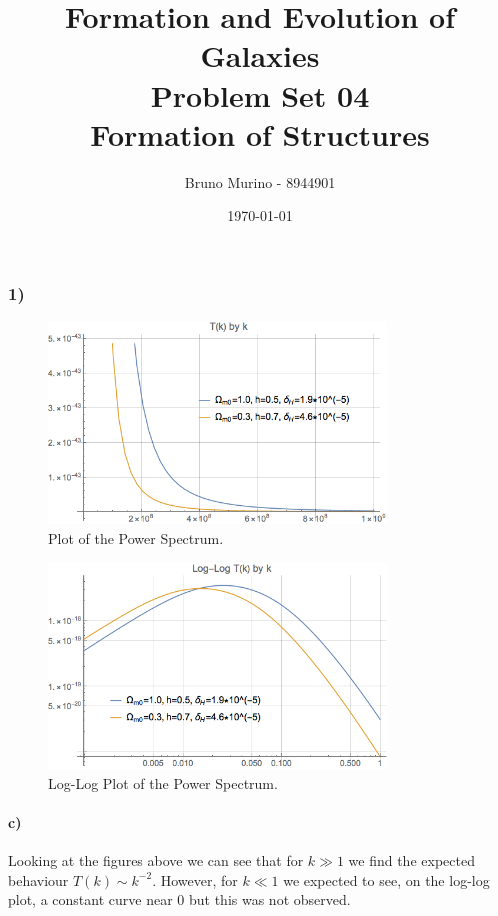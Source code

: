 \documentclass{_mypackages/monograph}
\title{Formation and Evolution of Galaxies \\ Problem Set 04 \\ Formation of Structures} %
\author{Bruno Murino - 8944901} %
\date{\today} %
\begin{document}

\solutionstp

\subsubsection{1)}

\begin{figure}[H]
    \centering
    \includegraphics[width=0.8\textwidth]{tkbyk.png}
    \caption{Plot of the Power Spectrum.}
    \label{fig:tkbyk}
\end{figure}

\begin{figure}[H]
    \centering
    \includegraphics[width=0.8\textwidth]{loglogtkbyk.png}
    \caption{Log-Log Plot of the Power Spectrum.}
    \label{fig:loglogtkbyk}
\end{figure}

\paragraph{c)}

Looking at the figures above we can see that for \(k\gg 1\) we find the expected behaviour \(T(k) \sim k^{-2}\). However, for \(k \ll 1\) we expected to see, on the log-log plot, a constant curve near \(0\) but this was not observed.
\end{document}
